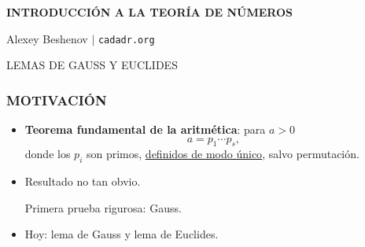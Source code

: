 

\usepackage{multicol}
\setlength{\columnseprule}{1pt}




\begin{frame}
  \textbf{INTRODUCCIÓN A LA TEORÍA DE NÚMEROS}

  Alexey Beshenov $\mid$ \texttt{cadadr.org}

  \vfill

  \begin{center}\huge\headingfont
    LEMAS DE GAUSS Y EUCLIDES
  \end{center}

  \vfill
\end{frame}

\begin{frame}
  \frametitle{MOTIVACIÓN}

  \begin{itemize}
  \item<2-> \textbf{Teorema fundamental de la aritmética}: para $a > 0$
    $$a = p_1 \cdots p_s,$$
    donde los $p_i$ son primos, \underline{definidos de modo único}, salvo permutación.

  \item<3-> Resultado no tan obvio.

    Primera prueba rigurosa: Gauss.

  \item<4-> Hoy: lema de Gauss y lema de Euclides.
  \end{itemize}
\end{frame}

